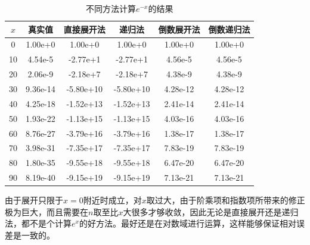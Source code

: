 \documentclass[12pt, a4paper, oneside]{article}
\begin{document}
\begin{table}[htp]
    \caption{不同方法计算$e^{-x}$的结果}
    \centering
    \label{tab:1}
    \begin{tabular}{|c|c|c|c|c|c|}
        \hline
        $x$ & 真实值 & 直接展开法 & 递归法 & 倒数展开法 & 倒数递归法 \\
        \hline
        0 & 1.00e+0 & 1.00e+0 & 1.00e+0 & 1.00e+0 & 1.00e+0 \\
        \hline
        10 & 4.54e-5 & -2.77e+1 & -2.77e+1 & 4.56e-5 & 4.56e-5 \\
        \hline
        20 & 2.06e-9 & -2.18e+7 & -2.18e+7 & 4.38e-9 & 4.38e-9 \\
        \hline
        30 & 9.36e-14 & -5.80e+10 & -5.80e+10 & 4.28e-12 & 4.28e-12 \\
        \hline
        40 & 4.25e-18 & -1.52e+13 & -1.52e+13 & 2.41e-14 & 2.41e-14 \\
        \hline
        50 & 1.93e-22 & -1.13e+15 & -1.13e+15 & 4.03e-16 & 4.03e-16 \\
        \hline
        60 & 8.76e-27 & -3.79e+16 & -3.79e+16 & 1.38e-17 & 1.38e-17 \\
        \hline
        70 & 3.98e-31 & -7.35e+17 & -7.35e+17 & 7.83e-19 & 7.83e-19 \\
        \hline
        80 & 1.80e-35 & -9.55e+18 & -9.55e+18 & 6.47e-20 & 6.47e-20 \\
        \hline
        90 & 8.19e-40 & -9.15e+19 & -9.15e+19 & 7.13e-21 & 7.13e-21 \\
        \hline
    \end{tabular}
    \end{table}
    由于展开只限于$x=0$附近时成立，对$x$取过大，由于阶乘项和指数项所带来的修正极为巨大，而且需要在$n$取至比$x$大很多才够收敛，因此无论是直接展开还是递归法，都不是个计算$e^x$的好方法。最好还是在对数域进行运算，这样能够保证相对误差是一致的。
\end{document}
